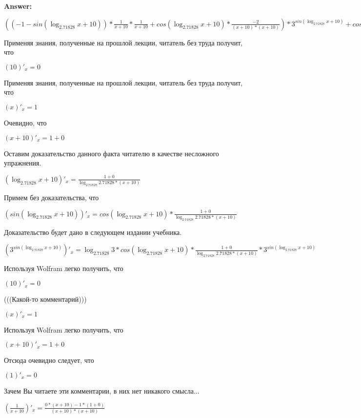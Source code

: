 \documentclass[12pt,a4paper,fleqn]{article}
\theoremstyle{definition}
\begin{document}
\textbf{Answer:}

$(( -1  - sin(\log_{ 2.71828 }{ x  +  10 })) * \frac{ 1 }{ x  +  10 }
 * \frac{ 1 }{ x  +  10 }
 + cos(\log_{ 2.71828 }{ x  +  10 }) * \frac{ -2 }{( x  +  10 ) * ( x  +  10 )}
) * { 3 }^{sin(\log_{ 2.71828 }{ x  +  10 })} + cos(\log_{ 2.71828 }{ x  +  10 }) * \frac{ 1 }{ x  +  10 }
 * cos(\log_{ 2.71828 }{ x  +  10 }) * \frac{ 1 }{ x  +  10 }
 * { 3 }^{sin(\log_{ 2.71828 }{ x  +  10 })}$

Применяя знания, полученные на прошлой лекции, читатель без труда получит, что 

$( 10 )'_{x} =  0 $

Применяя знания, полученные на прошлой лекции, читатель без труда получит, что 

$( x )'_{x} =  1 $

Очевидно, что 

$( x  +  10 )'_{x} =  1  +  0 $

Оставим доказательство данного факта читателю в качестве несложного упражнения. 

$(\log_{ 2.71828 }{ x  +  10 })'_{x} = \frac{ 1  +  0 }{\log_{ 2.71828 }{ 2.71828 } * ( x  +  10 )}
$

Примем без доказательства, что 

$(sin(\log_{ 2.71828 }{ x  +  10 }))'_{x} = cos(\log_{ 2.71828 }{ x  +  10 }) * \frac{ 1  +  0 }{\log_{ 2.71828 }{ 2.71828 } * ( x  +  10 )}
$

Доказательство будет дано в следующем издании учебника. 

$({ 3 }^{sin(\log_{ 2.71828 }{ x  +  10 })})'_{x} = \log_{ 2.71828 }{ 3 } * cos(\log_{ 2.71828 }{ x  +  10 }) * \frac{ 1  +  0 }{\log_{ 2.71828 }{ 2.71828 } * ( x  +  10 )}
 * { 3 }^{sin(\log_{ 2.71828 }{ x  +  10 })}$

Используя Wolfram легко получить, что 

$( 10 )'_{x} =  0 $

(((Какой-то комментарий))) 

$( x )'_{x} =  1 $

Используя Wolfram легко получить, что 

$( x  +  10 )'_{x} =  1  +  0 $

Отсюда очевидно следует, что 

$( 1 )'_{x} =  0 $

Зачем Вы читаете эти комментарии, в них нет никакого смысла... 

$(\frac{ 1 }{ x  +  10 }
)'_{x} = \frac{ 0  * ( x  +  10 ) -  1  * ( 1  +  0 )}{( x  +  10 ) * ( x  +  10 )}
$
\end{document}

